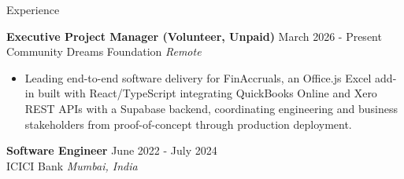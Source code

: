 \documentclass{resume}
\begin{document}
\begin{rSection}{Experience}

\textbf{Executive Project Manager (Volunteer, Unpaid)} \hfill March 2026 - Present\\
Community Dreams Foundation \hfill \textit{Remote}

\begin{itemize}
\vspace{-2mm}
  \item Leading end-to-end software delivery for FinAccruals, an Office.js Excel add-in built with React/TypeScript integrating QuickBooks Online and Xero REST APIs with a Supabase backend, coordinating engineering and business stakeholders from proof-of-concept through production deployment.
\end{itemize}

\textbf{Software Engineer} \hfill June 2022 - July 2024\\
ICICI Bank \hfill \textit{Mumbai, India}


\end{rSection}
\end{document}
